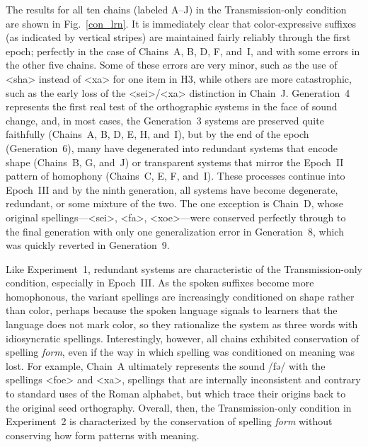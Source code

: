 \documentclass[doc,biblatex]{apa7}
\begin{document}
The results for all ten chains (labeled A--J) in the Transmission-only condition are shown in Fig.~\ref{con_lrn}. It is immediately clear that color-expressive suffixes (as indicated by vertical stripes) are maintained fairly reliably through the first epoch; perfectly in the case of Chains~A, B, D, F, and~I, and with some errors in the other five chains. Some of these errors are very minor, such as the use of <sha> instead of <xa> for one item in H3, while others are more catastrophic, such as the early loss of the <sei>/<xa> distinction in Chain~J. Generation~4 represents the first real test of the orthographic systems in the face of sound change, and, in most cases, the Generation~3 systems are preserved quite faithfully (Chains~A, B, D, E, H, and~I), but by the end of the epoch (Generation~6), many have degenerated into redundant systems that encode shape (Chains~B, G, and~J) or transparent systems that mirror the Epoch~II pattern of homophony (Chains~C, E, F, and~I). These processes continue into Epoch~III and by the ninth generation, all systems have become degenerate, redundant, or some mixture of the two. The one exception is Chain~D, whose original spellings---<sei>, <fa>, <xoe>---were conserved perfectly through to the final generation with only one generalization error in Generation~8, which was quickly reverted in Generation~9.

Like Experiment~1, redundant systems are characteristic of the Transmission-only condition, especially in Epoch~III. As the spoken suffixes become more homophonous, the variant spellings are increasingly conditioned on shape rather than color, perhaps because the spoken language signals to learners that the language does not mark color, so they rationalize the system as three words with idiosyncratic spellings. Interestingly, however, all chains exhibited conservation of spelling \textit{form}, even if the way in which spelling was conditioned on meaning was lost. For example, Chain~A ultimately represents the sound /fə/ with the spellings <foe> and <xa>, spellings that are internally inconsistent and contrary to standard uses of the Roman alphabet, but which trace their origins back to the original seed orthography. Overall, then, the Transmission-only condition in Experiment~2 is characterized by the conservation of spelling \textit{form} without conserving how form patterns with meaning.
\end{document}
